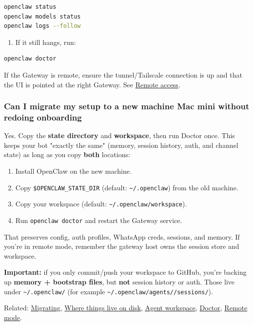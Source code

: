 \begin{lstlisting}[language=bash]
openclaw status
openclaw models status
openclaw logs --follow
\end{lstlisting}


\begin{enumerate}
  \item If it still hangs, run:
\end{enumerate}


\begin{lstlisting}[language=bash]
openclaw doctor
\end{lstlisting}


If the Gateway is remote, ensure the tunnel/Tailscale connection is up and that the UI
is pointed at the right Gateway. See \href{/gateway/remote}{Remote access}.

\subsubsection{Can I migrate my setup to a new machine Mac mini without redoing onboarding}


Yes. Copy the \textbf{state directory} and \textbf{workspace}, then run Doctor once. This
keeps your bot "exactly the same" (memory, session history, auth, and channel
state) as long as you copy \textbf{both} locations:

\begin{enumerate}
  \item Install OpenClaw on the new machine.
  \item Copy \texttt{\$OPENCLAW\_STATE\_DIR} (default: \texttt{\textasciitilde{}/.openclaw}) from the old machine.
  \item Copy your workspace (default: \texttt{\textasciitilde{}/.openclaw/workspace}).
  \item Run \texttt{openclaw doctor} and restart the Gateway service.
\end{enumerate}


That preserves config, auth profiles, WhatsApp creds, sessions, and memory. If you're in
remote mode, remember the gateway host owns the session store and workspace.

\textbf{Important:} if you only commit/push your workspace to GitHub, you're backing
up \textbf{memory + bootstrap files}, but \textbf{not} session history or auth. Those live
under \texttt{\textasciitilde{}/.openclaw/} (for example \texttt{\textasciitilde{}/.openclaw/agents//sessions/}).

Related: \href{/install/migrating}{Migrating}, \href{/help/faq\#where-does-openclaw-store-its-data}{Where things live on disk},
\href{/concepts/agent-workspace}{Agent workspace}, \href{/gateway/doctor}{Doctor},
\href{/gateway/remote}{Remote mode}.

